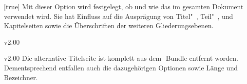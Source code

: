 \documentclass[english,ngerman,ttfont=roboto]{tudscrmanual}
\begin{document}
\begin{Declaration}{}[true]
\printdeclarationlist%
%
Mit dieser Option wird festgelegt, ob und wie das \TUDCD im gesamten Dokument 
verwendet wird. Sie hat Einfluss auf die Ausprägung von Titel"~, Teil"~, und 
Kapitelseiten sowie die Überschriften der weiteren Gliederungsebenen. 
\end{Declaration}

\begin{Obsolete}{v2.00}{}
\begin{Obsolete}{v2.00}{}
\printdeclarationlist%
%
Die alternative Titelseite ist komplett aus dem \TUDScript-Bundle entfernt 
worden. Dementsprechend entfallen auch die dazugehörigen Optionen sowie Länge 
und Bezeichner.
\end{Obsolete}
\end{Obsolete}

\PrintIndex
\PrintChangelog
\end{document}
